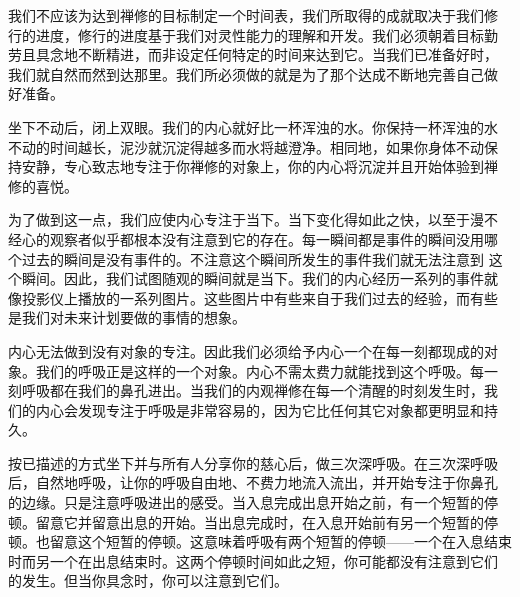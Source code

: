 我们不应该为达到禅修的目标制定一个时间表，我们所取得的成就取决于我们修
行的进度，修行的进度基于我们对灵性能力的理解和开发。我们必须朝着目标勤
劳且具念地不断精进，而非设定任何特定的时间来达到它。当我们已准备好时，
我们就自然而然到达那里。我们所必须做的就是为了那个达成不断地完善自己做
好准备。

坐下不动后，闭上双眼。我们的内心就好比一杯浑浊的水。你保持一杯浑浊的水
不动的时间越长，泥沙就沉淀得越多而水将越澄净。相同地，如果你身体不动保
持安静，专心致志地专注于你禅修的对象上，你的内心将沉淀并且开始体验到禅
修的喜悦。

为了做到这一点，我们应使内心专注于当下。当下变化得如此之快，以至于漫不
经心的观察者似乎都根本没有注意到它的存在。每一瞬间都是事件的瞬间没用哪
个过去的瞬间是没有事件的。不注意这个瞬间所发生的事件我们就无法注意到
这个瞬间。因此，我们试图随观的瞬间就是当下。我们的内心经历一系列的事件就
像投影仪上播放的一系列图片。这些图片中有些来自于我们过去的经验，而有些
是我们对未来计划要做的事情的想象。

内心无法做到没有对象的专注。因此我们必须给予内心一个在每一刻都现成的对
象。我们的呼吸正是这样的一个对象。内心不需太费力就能找到这个呼吸。每一
刻呼吸都在我们的鼻孔进出。当我们的内观禅修在每一个清醒的时刻发生时，我
们的内心会发现专注于呼吸是非常容易的，因为它比任何其它对象都更明显和持
久。

按已描述的方式坐下并与所有人分享你的慈心后，做三次深呼吸。在三次深呼吸
后，自然地呼吸，让你的呼吸自由地、不费力地流入流出，并开始专注于你鼻孔
的边缘。只是注意呼吸进出的感受。当入息完成出息开始之前，有一个短暂的停
顿。留意它并留意出息的开始。当出息完成时，在入息开始前有另一个短暂的停
顿。也留意这个短暂的停顿。这意味着呼吸有两个短暂的停顿——一个在入息结束
时而另一个在出息结束时。这两个停顿时间如此之短，你可能都没有注意到它们
的发生。但当你具念时，你可以注意到它们。

\endchapter

\byebye
